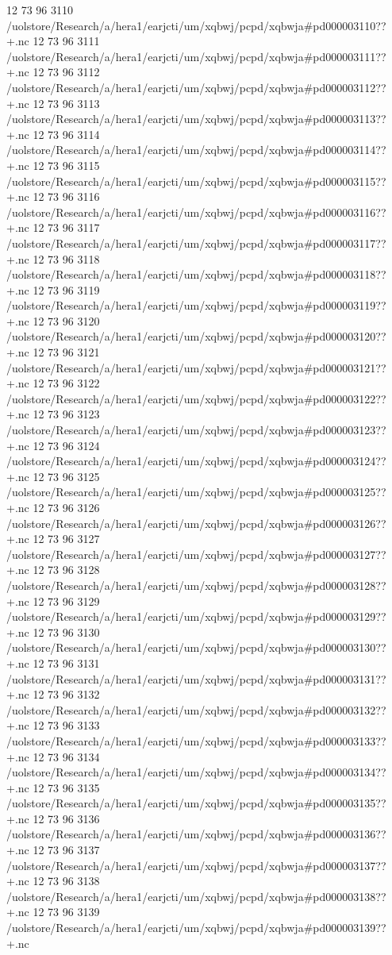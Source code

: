 12 73 96
3110
/uolstore/Research/a/hera1/earjcti/um/xqbwj/pcpd/xqbwja#pd000003110??+.nc
12 73 96
3111
/uolstore/Research/a/hera1/earjcti/um/xqbwj/pcpd/xqbwja#pd000003111??+.nc
12 73 96
3112
/uolstore/Research/a/hera1/earjcti/um/xqbwj/pcpd/xqbwja#pd000003112??+.nc
12 73 96
3113
/uolstore/Research/a/hera1/earjcti/um/xqbwj/pcpd/xqbwja#pd000003113??+.nc
12 73 96
3114
/uolstore/Research/a/hera1/earjcti/um/xqbwj/pcpd/xqbwja#pd000003114??+.nc
12 73 96
3115
/uolstore/Research/a/hera1/earjcti/um/xqbwj/pcpd/xqbwja#pd000003115??+.nc
12 73 96
3116
/uolstore/Research/a/hera1/earjcti/um/xqbwj/pcpd/xqbwja#pd000003116??+.nc
12 73 96
3117
/uolstore/Research/a/hera1/earjcti/um/xqbwj/pcpd/xqbwja#pd000003117??+.nc
12 73 96
3118
/uolstore/Research/a/hera1/earjcti/um/xqbwj/pcpd/xqbwja#pd000003118??+.nc
12 73 96
3119
/uolstore/Research/a/hera1/earjcti/um/xqbwj/pcpd/xqbwja#pd000003119??+.nc
12 73 96
3120
/uolstore/Research/a/hera1/earjcti/um/xqbwj/pcpd/xqbwja#pd000003120??+.nc
12 73 96
3121
/uolstore/Research/a/hera1/earjcti/um/xqbwj/pcpd/xqbwja#pd000003121??+.nc
12 73 96
3122
/uolstore/Research/a/hera1/earjcti/um/xqbwj/pcpd/xqbwja#pd000003122??+.nc
12 73 96
3123
/uolstore/Research/a/hera1/earjcti/um/xqbwj/pcpd/xqbwja#pd000003123??+.nc
12 73 96
3124
/uolstore/Research/a/hera1/earjcti/um/xqbwj/pcpd/xqbwja#pd000003124??+.nc
12 73 96
3125
/uolstore/Research/a/hera1/earjcti/um/xqbwj/pcpd/xqbwja#pd000003125??+.nc
12 73 96
3126
/uolstore/Research/a/hera1/earjcti/um/xqbwj/pcpd/xqbwja#pd000003126??+.nc
12 73 96
3127
/uolstore/Research/a/hera1/earjcti/um/xqbwj/pcpd/xqbwja#pd000003127??+.nc
12 73 96
3128
/uolstore/Research/a/hera1/earjcti/um/xqbwj/pcpd/xqbwja#pd000003128??+.nc
12 73 96
3129
/uolstore/Research/a/hera1/earjcti/um/xqbwj/pcpd/xqbwja#pd000003129??+.nc
12 73 96
3130
/uolstore/Research/a/hera1/earjcti/um/xqbwj/pcpd/xqbwja#pd000003130??+.nc
12 73 96
3131
/uolstore/Research/a/hera1/earjcti/um/xqbwj/pcpd/xqbwja#pd000003131??+.nc
12 73 96
3132
/uolstore/Research/a/hera1/earjcti/um/xqbwj/pcpd/xqbwja#pd000003132??+.nc
12 73 96
3133
/uolstore/Research/a/hera1/earjcti/um/xqbwj/pcpd/xqbwja#pd000003133??+.nc
12 73 96
3134
/uolstore/Research/a/hera1/earjcti/um/xqbwj/pcpd/xqbwja#pd000003134??+.nc
12 73 96
3135
/uolstore/Research/a/hera1/earjcti/um/xqbwj/pcpd/xqbwja#pd000003135??+.nc
12 73 96
3136
/uolstore/Research/a/hera1/earjcti/um/xqbwj/pcpd/xqbwja#pd000003136??+.nc
12 73 96
3137
/uolstore/Research/a/hera1/earjcti/um/xqbwj/pcpd/xqbwja#pd000003137??+.nc
12 73 96
3138
/uolstore/Research/a/hera1/earjcti/um/xqbwj/pcpd/xqbwja#pd000003138??+.nc
12 73 96
3139
/uolstore/Research/a/hera1/earjcti/um/xqbwj/pcpd/xqbwja#pd000003139??+.nc

